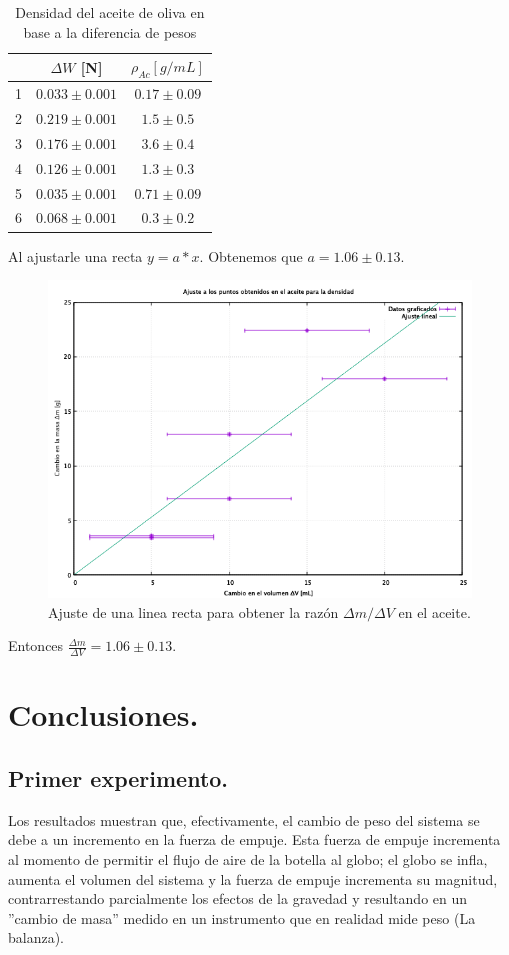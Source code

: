 \documentclass[a4paper]{article}
\begin{document}
\begin{table}[H]
  \centering
    \begin{tabular}{|c|c|c|} \hline
          & $\Delta W$ [N] & $\rho_{Ac} [g/mL]$ \\ \hline
    1     & $0.033\pm0.001$ & $0.17\pm0.09$  \\ \hline
    2     & $0.219\pm0.001$ & $1.5\pm0.5$  \\ \hline
    3     & $0.176\pm0.001$ & $3.6\pm0.4$  \\ \hline
    4     & $0.126\pm0.001$ & $1.3\pm0.3$  \\ \hline
    5     & $0.035\pm0.001$ & $0.71\pm0.09$  \\ \hline
    6     & $0.068\pm0.001$ & $0.3\pm0.2$  \\ \hline
    \end{tabular}%
  \caption{Densidad del aceite de oliva en base a la diferencia de pesos}
\end{table}%

Al ajustarle una recta $y = a*x$. Obtenemos que $a = 1.06 \pm 0.13$.
\begin{figure}[H]
    \centering
    \includegraphics[width=12cm]{Aceiteden.png}
    \caption{Ajuste de una linea recta para obtener la razón $\Delta m / \Delta V$ en el aceite.}
\end{figure}

Entonces $\frac{\Delta m}{\Delta V} = 1.06 \pm 0.13$.

\section*{Conclusiones.}
\subsection*{Primer experimento.}
Los resultados muestran que, efectivamente, el cambio de peso del sistema se debe a un incremento en la fuerza de empuje. Esta fuerza de empuje incrementa al momento de permitir el flujo de aire de la botella al globo; el globo se infla, aumenta el volumen del sistema y la fuerza de empuje incrementa su magnitud, contrarrestando parcialmente los efectos de la gravedad y resultando en un ''cambio de masa'' medido en un instrumento que en realidad mide peso (La balanza).
\end{document}
